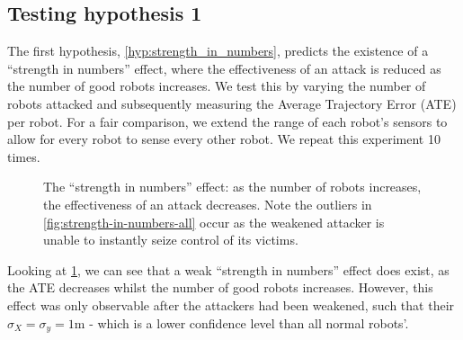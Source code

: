 
\subsection{Testing hypothesis 1}
The first hypothesis, \ref{hyp:strength_in_numbers}, predicts the existence of a ``strength in numbers'' effect, where the effectiveness of an attack is reduced as the number of good robots increases. We test this by varying the number of robots attacked and subsequently measuring the Average Trajectory Error (ATE) per robot. For a fair comparison, we extend the range of each robot's sensors to allow for every robot to sense every other robot. We repeat this experiment 10 times.
\begin{figure}[!h]
	\centering
	\caption{The ``strength in numbers'' effect: as the number of robots increases, the effectiveness of an attack decreases. Note the outliers in \ref{fig:strength-in-numbers-all} occur as the weakened attacker is unable to instantly seize control of its victims.}
	\label{fig:strength-in-numbers}
\end{figure}

Looking at \ref{fig:strength-in-numbers}, we can see that a weak ``strength in numbers'' effect does exist, as the ATE decreases whilst the number of good robots increases. However, this effect was only observable after the attackers had been weakened, such that their $\sigma_X = \sigma_y = 1$m - which is a lower confidence level than all normal robots'.

